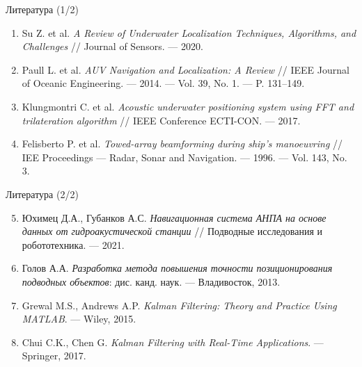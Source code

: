 \documentclass[aspectratio=169, 12pt]{beamer}
\begin{document}
\begin{frame}{Литература (1/2)}
    \footnotesize
    \begin{enumerate}
        \item Su Z. et al. \textit{A Review of Underwater Localization Techniques, Algorithms, and Challenges} // Journal of Sensors. --- 2020.
        \item Paull L. et al. \textit{AUV Navigation and Localization: A Review} // IEEE Journal of Oceanic Engineering. --- 2014. --- Vol. 39, No. 1. --- P. 131--149.
        \item Klungmontri C. et al. \textit{Acoustic underwater positioning system using FFT and trilateration algorithm} // IEEE Conference ECTI-CON. --- 2017.
        \item Felisberto P. et al. \textit{Towed-array beamforming during ship's manoeuvring} // IEE Proceedings --- Radar, Sonar and Navigation. --- 1996. --- Vol. 143, No. 3.
    \end{enumerate}
\end{frame}

\begin{frame}{Литература (2/2)}
    \footnotesize
    \begin{enumerate}
        \setcounter{enumi}{4}
        \item Юхимец Д.А., Губанков А.С. \textit{Навигационная система АНПА на основе данных от гидроакустической станции} // Подводные исследования и робототехника. --- 2021.
        \item Голов А.А. \textit{Разработка метода повышения точности позиционирования подводных объектов}: дис. канд. наук. --- Владивосток, 2013.
        \item Grewal M.S., Andrews A.P. \textit{Kalman Filtering: Theory and Practice Using MATLAB}. --- Wiley, 2015.
        \item Chui C.K., Chen G. \textit{Kalman Filtering with Real-Time Applications}. --- Springer, 2017.
    \end{enumerate}
\end{frame}

\appendix
\end{document}
